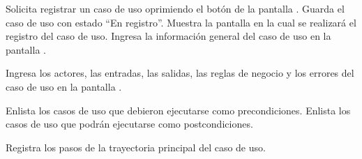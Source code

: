  \begin{UCtrayectoria}
    \UCpaso[\UCactor] Solicita registrar un caso de uso oprimiendo el botón  de la pantalla .
    \UCpaso[\UCsist] Guarda el caso de uso con estado ``En registro''.
    \UCpaso[\UCsist] Muestra la pantalla  en la cual se realizará el registro del caso de uso. 
    \UCpaso[\UCactor] Ingresa la información general del caso de uso en la pantalla . 
    
    \UCpaso[\UCactor] Ingresa los actores, las entradas, las salidas, las reglas de negocio y los errores del caso de uso en la pantalla .\label{cu5.1:ingresaDatos}
    
    \UCpaso[\UCactor] Enlista los casos de uso que debieron ejecutarse como precondiciones.
    \UCpaso[\UCactor] Enlista los casos de uso que podrán ejecutarse como postcondiciones.
    
    \UCpaso[\UCactor] Registra los pasos de la trayectoria principal del caso de uso.  \label{cu5.1:ingresaTrayP}


\end{UCtrayectoria}
